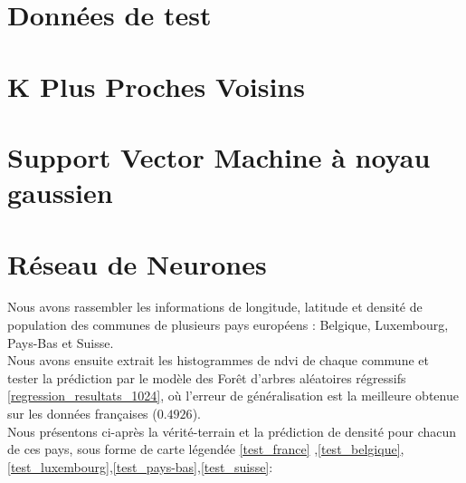 \documentclass{book}
\begin{document}
\section{Données de test}

\section{K Plus Proches Voisins}

\section{Support Vector Machine à noyau gaussien}

\section{Réseau de Neurones}

Nous avons rassembler les informations de longitude, latitude et densité de population des communes de plusieurs pays européens : Belgique, 
Luxembourg, Pays-Bas et Suisse.\\
Nous avons ensuite extrait les histogrammes de ndvi de chaque commune et tester la prédiction par le modèle des For\^{e}t d'arbres aléatoires régressifs
\ref{regression_resultats_1024}, où l'erreur de généralisation est la meilleure obtenue sur les données françaises ($0.4926$).\\

Nous présentons ci-après la vérité-terrain et la prédiction de densité pour chacun de ces pays, sous forme de carte légendée \ref{test_france}
,\ref{test_belgique},\ref{test_luxembourg},\ref{test_pays-bas},\ref{test_suisse}:\\
\end{document}
